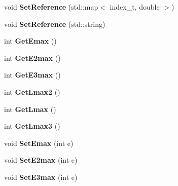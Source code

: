 \begin{DoxyCompactItemize}
\item 
\hypertarget{classModelSpace_a238be47279298ca0b5902c98972b849c}{void {\bfseries Set\-Reference} (std\-::map$<$ index\-\_\-t, double $>$)}\label{classModelSpace_a238be47279298ca0b5902c98972b849c}

\item 
\hypertarget{classModelSpace_acec826abd780c03ea45821e05371d4e7}{void {\bfseries Set\-Reference} (std\-::string)}\label{classModelSpace_acec826abd780c03ea45821e05371d4e7}

\item 
\hypertarget{classModelSpace_a68589449fbb7240d68877fcdc133a1d7}{int {\bfseries Get\-Emax} ()}\label{classModelSpace_a68589449fbb7240d68877fcdc133a1d7}

\item 
\hypertarget{classModelSpace_ad5289ea77c79b0ce4d9a9824374cad04}{int {\bfseries Get\-E2max} ()}\label{classModelSpace_ad5289ea77c79b0ce4d9a9824374cad04}

\item 
\hypertarget{classModelSpace_a43b38395bba0af89b60a24dbe1323a07}{int {\bfseries Get\-E3max} ()}\label{classModelSpace_a43b38395bba0af89b60a24dbe1323a07}

\item 
\hypertarget{classModelSpace_a876da946190e1a04ed1f72a2097f93ac}{int {\bfseries Get\-Lmax2} ()}\label{classModelSpace_a876da946190e1a04ed1f72a2097f93ac}

\item 
\hypertarget{classModelSpace_aa1c7e751519d7070b84e2116cb7bcb2a}{int {\bfseries Get\-Lmax} ()}\label{classModelSpace_aa1c7e751519d7070b84e2116cb7bcb2a}

\item 
\hypertarget{classModelSpace_a3ec5612a3064eac5bafbf0b2709c5cc0}{int {\bfseries Get\-Lmax3} ()}\label{classModelSpace_a3ec5612a3064eac5bafbf0b2709c5cc0}

\item 
\hypertarget{classModelSpace_ad28541b219257d967a299046e6b6e9e5}{void {\bfseries Set\-Emax} (int e)}\label{classModelSpace_ad28541b219257d967a299046e6b6e9e5}

\item 
\hypertarget{classModelSpace_ad970185c03f12be950c4ca3903370a64}{void {\bfseries Set\-E2max} (int e)}\label{classModelSpace_ad970185c03f12be950c4ca3903370a64}

\item 
\hypertarget{classModelSpace_ae46d0574068271181e382122289c8e61}{void {\bfseries Set\-E3max} (int e)}\label{classModelSpace_ae46d0574068271181e382122289c8e61}


\end{DoxyCompactItemize}
